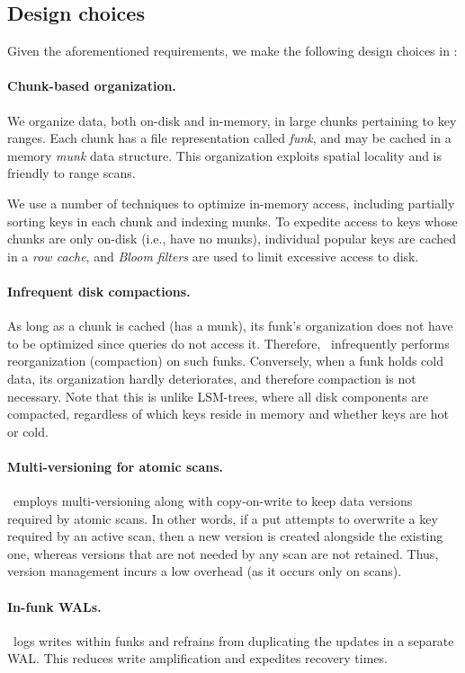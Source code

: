 
\subsection{Design choices}

Given the aforementioned requirements, we make the following design choices in \sys:

\paragraph{Chunk-based organization.}
We organize data, both on-disk and in-memory,  in large chunks pertaining to  key ranges.  
Each chunk has a file representation called  \emph{funk}, and may be cached in a  memory \emph{munk} data structure.
This organization exploits spatial locality and is friendly to range scans.

We use a number of techniques to optimize in-memory  access, including partially sorting keys in each chunk and 
indexing munks. 
To expedite access to  keys whose chunks are only on-disk  (i.e., have no munks), 
individual popular keys are cached in a \emph{row cache}, 
and \emph{Bloom filters} are used to limit excessive access to disk. 

\paragraph{Infrequent disk compactions.} 
As long as a chunk is cached (has a munk), its funk's organization does not have to be optimized since 
queries do not access it. Therefore, \sys\ infrequently performs reorganization (compaction) on such funks.
Conversely, when a funk holds cold data, its organization hardly deteriorates, and therefore compaction is not necessary.
Note that this is unlike LSM-trees, where all disk components are compacted, regardless of which keys reside in memory and whether 
keys are hot or cold. 

\paragraph{Multi-versioning for atomic scans.} \sys\ employs multi-versioning along with
copy-on-write to keep data versions required by atomic scans. 
In other words, if a put attempts to overwrite a key  required by an active scan, then a new version is created alongside the 
existing one, whereas versions that are not needed by any scan are not retained. 
Thus, version management incurs a low overhead (as it occurs only on scans). 

\paragraph{In-funk WALs.} \sys\ logs writes within funks and refrains from duplicating the updates  in a separate WAL. This reduces write amplification and expedites recovery times. 
